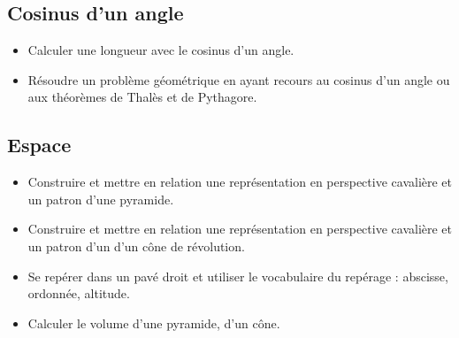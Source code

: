 \documentclass[a4paper,12pt,fleqn]{article}	
\begin{document}
\subsection*{Cosinus d'un angle}

\begin{itemize}
	\item {}Calculer une longueur avec le cosinus d'un angle.
	\item {}Résoudre un problème géométrique en ayant recours au cosinus d'un angle ou aux théorèmes de Thalès et de Pythagore.
\end{itemize}

\subsection*{Espace}

\begin{itemize}
	\item {}Construire et mettre en relation une représentation en perspective cavalière et un patron d’une pyramide.
	\item {}Construire et mettre en relation une représentation en perspective cavalière et un patron d’un d’un cône de révolution.
	\item {}Se repérer dans un pavé droit et utiliser le vocabulaire du repérage : abscisse, ordonnée, altitude.
	\item {}Calculer le volume d’une pyramide, d’un cône.
\end{itemize}
	
\end{document}

